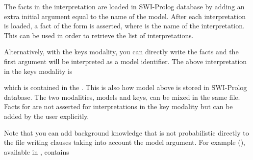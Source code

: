 \documentclass[letterpaper,10pt,english]{sphinxmanual}
\begin{document}
The facts in the interpretation are loaded in SWI-Prolog database by adding an extra initial argument equal to the name of the model.
After each interpretation is loaded, a fact of the form  is asserted, where  is the name of the interpretation.
This can be used in order to retrieve the list of interpretations.

Alternatively, with the keys modality, you can directly write the facts and the first argument will be interpreted as a model identifier.
The above interpretation in the keys modality is

%
\begin{sphinxVerbatim}[commandchars=\\\{\}]
\end{sphinxVerbatim}

which is contained in the .
This is also how model  above is stored in SWI-Prolog database.
The two modalities, models and keys, can be mixed in the same file.
Facts for  are not asserted for interpretations in the key modality but can be added by the user explicitly.

Note that you can add background knowledge that is not probabilistic directly to the file writing clauses taking into account the model argument.
For example (), available in , contains
\end{document}
